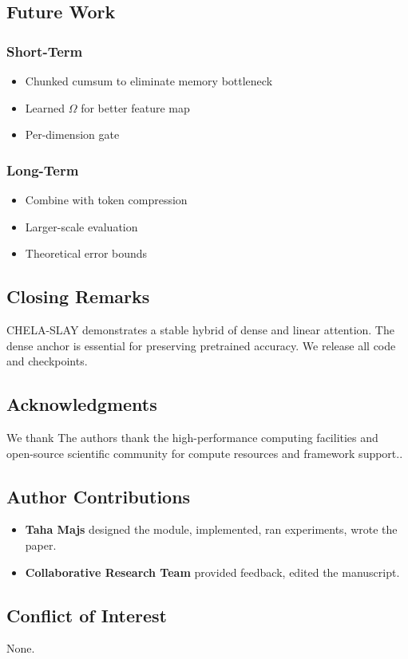 \subsection{Future Work}

\subsubsection{Short-Term}
\begin{itemize}
\item Chunked cumsum to eliminate memory bottleneck
\item Learned $\Omega$ for better feature map
\item Per-dimension gate

\end{itemize}
\subsubsection{Long-Term}
\begin{itemize}
\item Combine with token compression
\item Larger-scale evaluation
\item Theoretical error bounds

\end{itemize}
\subsection{Closing Remarks}

CHELA-SLAY demonstrates a stable hybrid of dense and linear attention. The 
dense anchor is essential for preserving pretrained accuracy. We release all 
code and checkpoints.

\subsection{Acknowledgments}

We thank The authors thank the high-performance computing facilities and open-source scientific community for compute resources and framework support..

\subsection{Author Contributions}

\begin{itemize}
\item \textbf{Taha Majs} designed the module, implemented, ran experiments, wrote
  the paper.
\item \textbf{Collaborative Research Team} provided feedback, edited the manuscript.

\end{itemize}
\subsection{Conflict of Interest}

None.

